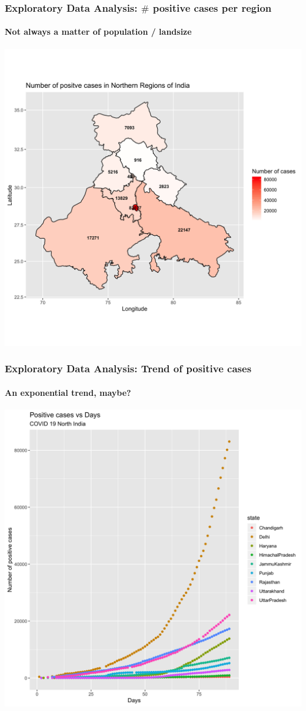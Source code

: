 \documentclass{beamer}
\begin{document}
{\begin{frame}
\end{frame}
\begin{frame}
	\frametitle{Exploratory Data Analysis: $\#$ positive cases per region}
	\framesubtitle{Not always a matter of population / landsize}
	\center \includegraphics[scale = 0.1]{pos.png}
\end{frame}
\begin{frame}
	\frametitle{Exploratory Data Analysis: Trend of positive cases}
	\framesubtitle{An exponential trend, maybe?}
	\center \includegraphics[scale = 0.085]{pos_date.png}

\end{frame}}
\end{document}
